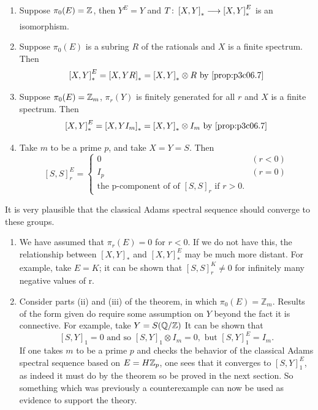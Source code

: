 \documentclass[../main]{subfiles}
\begin{document}
  
\begin{examples}


\begin{enumerate} 
  \item [(ia)] Suppose $\pi_{0}(E)=\mathbb{Z}$, then $Y^E=Y$ and $T\colon \left[X,Y\right]^{}_{\ast} \lar{} \left[X,Y\right]^{E}_{\ast}$ is an isomorphism. 
  \item [(ib)] Suppose $ \pi_{0}(E)$ is a subring $R$ of the rationals and $X$ is a finite spectrum. Then 
    \[
      \left[X,Y\right]^{E}_{\ast} = \left[X,YR\right]^{}_{\ast} = \left[X,Y\right]^{}_{\ast} \otimes R \text{  by \ref{prop:p3c06.7}}
    \] 
  \item [(iia)] Suppose $ \pi_{0}(E)=\mathbb{Z}_{m}$, $ \pi_{r}(Y)$ is finitely generated for all $r$ and $X$ is a finite spectrum. Then
    \[
      \left[X,Y\right]^{E}_{\ast} = \left[X,YI_{m}\right]^{}_{\ast} = \left[X,Y\right]^{}_{\ast} \otimes I_{m} \text{  by \ref{prop:p3c06.7}}
    \] 
  \item [(iib)] Take $m$ to be a prime $p$, and take $X = Y = S$. Then
    \[
    \left[S,S\right]^{E}_{r} = 
      \begin{cases} 
        0 & (r<0)\\
        I_{p} & (r=0)\\
        \text{the p-component of of $\left[S,S\right]^{}_{r}$ if $r>0$}.  
      \end{cases}
    \] 
\end{enumerate}
\end{examples}
It is very plausible that the classical Adams spectral sequence should converge to these groups.
\begin{warning}
\begin{enumerate} 
  \item [(i)] We have assumed that $\pi_{r}(E)=0$ for $r<0$. If we do not have this, the relationship between $\left[X,Y\right]_{\ast}$ and $\left[X,Y\right]^E _{\ast}$ may be much more distant. For example, take $E=K$; it can be shown that $\left[S,S\right]^K_{r} \neq 0$ for infinitely many negative values of r.

    \item [(ii)] Consider parts (ii) and (iii) of the theorem, in which $\pi_{0}(E)=\mathbb{Z}_{m}$. Results of the form given do require some assumption on $Y$ beyond the fact it is connective. For example, take $Y = S(\mathbb{Q}/\mathbb{Z})$ It can be shown that 
      \[
        \left[S,Y\right]_{1} = 0 \text{  and so } \left[S,Y\right]_{1} \otimes I_{m} = 0, \text{  but } \left[S,Y\right]^E _{1} = I_{m}.
      \] 
  If one takes $m$ to be a prime $p$ and checks the behavior of the classical Adams spectral sequence based on $E=H\mathbb{Z}_{p}$, one sees that it converges to $ \left[S,Y\right]^E _{1}$, as indeed it must do by the theorem so be proved in the next section. So something which was previously a counterexample can now be used as evidence to support the theory.
\end{enumerate}
\end{warning}
\end{document}
